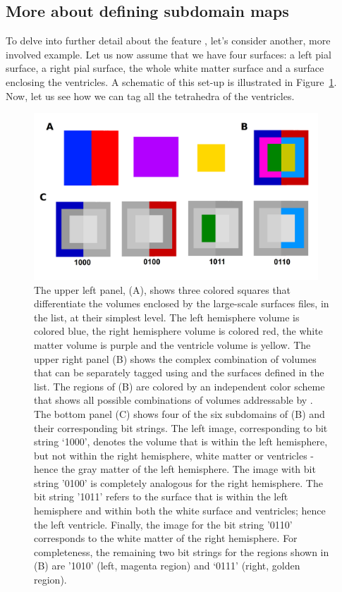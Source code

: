 \subsection{More about defining \svmtk{} subdomain maps}  
\label{chp4:subdomains}
To delve into further detail about the \svmtk{} feature
, let's consider another, more involved
example. Let us now assume that we have four surfaces: a left pial
surface, a right pial surface, the whole white matter surface and a
surface enclosing the ventricles. A schematic of this set-up is
illustrated in Figure~\ref{fig:chp4:smap-example}. Now, let us see how
we can tag all the tetrahedra of the ventricles.
\begin{figure}[t]
  \includegraphics[width=0.95\textwidth]{./graphics/chp4/dot.png}
  \caption{The upper left panel, (A), shows three colored squares that
    differentiate the volumes enclosed by the large-scale surfaces
    files, in the  list, at their simplest
    level. The left hemisphere volume is colored blue, the right
    hemisphere volume is colored red, the white matter volume is
    purple and the ventricle volume is yellow. The upper right panel
    (B) shows the complex combination of volumes that can be
    separately tagged using  and the surfaces
    defined in the  list. The regions of (B)
    are colored by an independent color scheme that shows all possible
    combinations of volumes addressable by .
    The bottom panel (C) shows four of the six subdomains of (B) and
    their corresponding bit strings. The left image, corresponding to
    bit string `1000', denotes the volume that is within the left
    hemisphere, but not within the right hemisphere, white matter or
    ventricles - hence the gray matter of the left hemisphere. The
    image with bit string '0100' is completely analogous for the right
    hemisphere. The bit string '1011' refers to the surface that is
    within the left hemisphere and within both the white surface and
    ventricles; hence the left ventricle. Finally, the image for the
    bit string '0110' corresponds to the white matter of the right
    hemisphere. For completeness, the remaining two bit strings for
    the regions shown in (B) are '1010' (left, magenta region) and
    `0111' (right, golden region).}
\label{fig:chp4:smap-example}
\end{figure}

